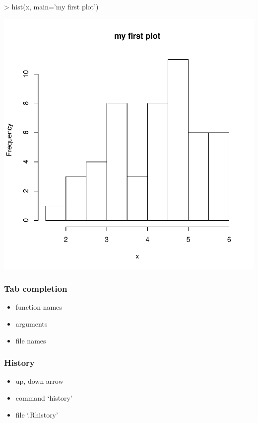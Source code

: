 \documentclass[10pt,letterpaper]{article}
\newenvironment{Schunk}{}{}
\begin{document}
\begin{center}
\begin{Schunk}
\begin{Sinput}
> hist(x, main='my first plot')
\end{Sinput}
\end{Schunk}
\includegraphics{Lab0-firstsessionplot}
\end{center}


\subsubsection{Tab completion} %
\label{ssub:tab_completion}
\begin{itemize}
    \item function names
    \item arguments
    \item file names
\end{itemize}

\subsubsection{History} %
\label{ssub:history}
\begin{itemize}
    \item up, down arrow
    \item command `history'
    \item file `.Rhistory'
\end{itemize}
\end{document}
